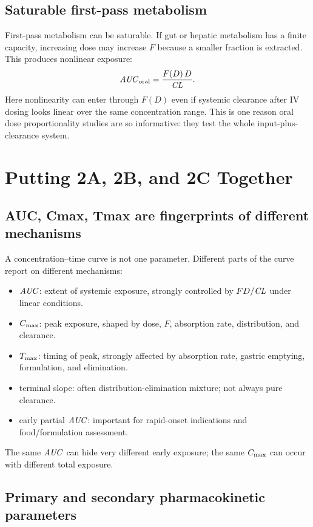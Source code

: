 \documentclass[a4paper]{article}
\newcommand{\CL}{\ensuremath{\pksym{CL}}}
\newcommand{\AUC}{\ensuremath{\pksym{AUC}}}
\newcommand{\Cmax}{\ensuremath{C_{\pklab{max}}}}
\newcommand{\Tmax}{\ensuremath{T_{\pklab{max}}}}
\newcommand{\Fbio}{\ensuremath{F}}
\begin{document}
\subsection{Saturable first-pass metabolism}

First-pass metabolism can be saturable. If gut or hepatic metabolism has a finite capacity, increasing dose may increase \(\Fbio\) because a smaller fraction is extracted. This produces nonlinear exposure:
\[
  \AUC_{\pklab{oral}}
  =
  \frac{\Fbio(D)\,D}{\CL}.
\]
Here nonlinearity can enter through \(\Fbio(D)\) even if systemic clearance after IV dosing looks linear over the same concentration range. This is one reason oral dose proportionality studies are so informative: they test the whole input-plus-clearance system.

\section{Putting 2A, 2B, and 2C Together}

\subsection{AUC, Cmax, Tmax are fingerprints of different mechanisms}

A concentration--time curve is not one parameter. Different parts of the curve report on different mechanisms:
\begin{itemize}[leftmargin=2em]
  \item \(\AUC\): extent of systemic exposure, strongly controlled by \(\Fbio D/\CL\) under linear conditions.
  \item \(\Cmax\): peak exposure, shaped by dose, \(\Fbio\), absorption rate, distribution, and clearance.
  \item \(\Tmax\): timing of peak, strongly affected by absorption rate, gastric emptying, formulation, and elimination.
  \item terminal slope: often distribution-elimination mixture; not always pure clearance.
  \item early partial \(\AUC\): important for rapid-onset indications and food/formulation assessment.
\end{itemize}
The same \(\AUC\) can hide very different early exposure; the same \(\Cmax\) can occur with different total exposure.

\subsection{Primary and secondary pharmacokinetic parameters}
\end{document}

